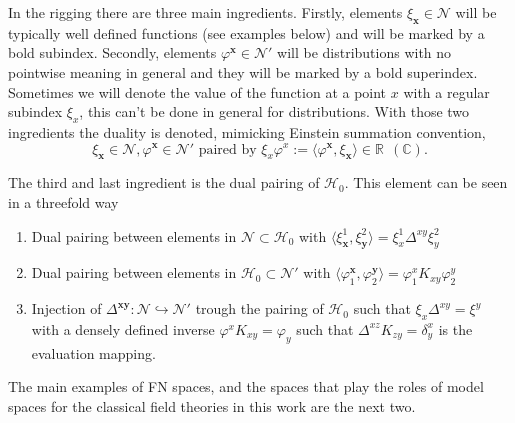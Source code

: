 \documentclass[12pt]{article}%
\begin{document}
In the rigging there are three main ingredients. Firstly,  elements  $\xi_{\mathbf{x}}\in\mathcal{N}$ will be typically well defined functions (see examples below) and will be marked by a bold subindex.  Secondly,  elements $\varphi^{\mathbf{x}}\in\mathcal{N}'$ will be distributions with no pointwise meaning in general and they will be marked by a bold superindex. Sometimes we will denote the value of the function at a point $x$  with  a regular subindex $\xi_x$, this can't be done in general for distributions. With those two ingredients the duality is denoted, mimicking Einstein summation convention, 
\begin{equation}
\label{eq:dualityNotationDistributions}
\xi_{\mathbf{x}}\in\mathcal{N}, \varphi^{\mathbf{x}}\in\mathcal{N}' \textrm{ paired by } \xi_x\varphi^x :=\langle\varphi^{\mathbf{x}},\xi_{\mathbf{x}}\rangle \in \mathbb{R}\ \ (\mathbb{C}).
\end{equation}

The third and last ingredient is the dual pairing of $\mathcal{H}_0$. This element can be seen in a threefold way
\begin{enumerate}[label=\alph*)]
    \item Dual pairing between elements in $\mathcal{N}\subset \mathcal{H}_0$ with $\langle\xi^1_{\mathbf{x}} ,\xi^2_{\mathbf{y}}\rangle =\xi^1_x\Delta^{xy}\xi_y^2$
    \item Dual pairing between elements in  $ \mathcal{H}_0\subset \mathcal{N}'$ with $\langle\varphi_1^{\mathbf{x}} ,\varphi_2^{\mathbf{y}}\rangle =\varphi_1^xK_{xy}\varphi^y_2$ 
    \item Injection of ${\Delta^{\mathbf{xy}}}:\mathcal{N}\hookrightarrow \mathcal{N}'$ trough the pairing of $\mathcal{H}_0$ such that $\xi_x\Delta^{xy}=\xi^y$ with a densely defined inverse $\varphi^xK_{xy}=\varphi_y$ such that $\Delta^{xz}K_{zy}=\delta^x_y$ is the evaluation mapping.
\end{enumerate}


The main examples of FN spaces, and the spaces that play the roles of model spaces for the classical field theories in this work are the next two.
\end{document}
